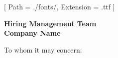 


\renewcommand{\photo}[2]{}

\ifmonochrome
  \renewcommand{\marginpar}[1]{}
\fi

\geometry{
  left=2cm,
  right=2cm,
  top=2cm,
  bottom=2cm,
  portrait
}

\setmainfont{NotoSans-Regular}[
  Path = ./fonts/,
  Extension = .ttf
]



\makecvheader

\vspace{1cm}
\indent\textbf{Hiring Management Team}\\
\indent\textbf{Company Name}

\vspace{0.5cm}

\noindent To whom it may concern:

\vspace{0.5cm}

\justifying

